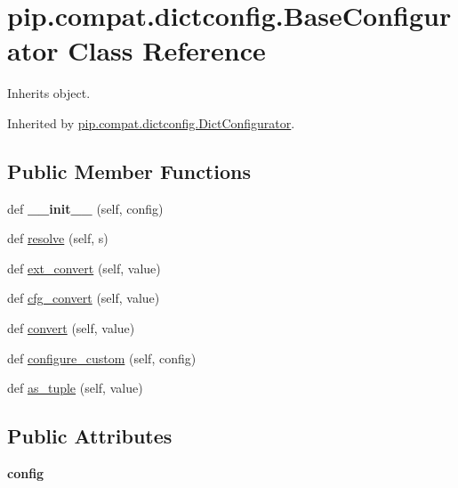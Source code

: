 \hypertarget{classpip_1_1compat_1_1dictconfig_1_1_base_configurator}{}\section{pip.\+compat.\+dictconfig.\+Base\+Configurator Class Reference}
\label{classpip_1_1compat_1_1dictconfig_1_1_base_configurator}


Inherits object.



Inherited by \hyperlink{classpip_1_1compat_1_1dictconfig_1_1_dict_configurator}{pip.\+compat.\+dictconfig.\+Dict\+Configurator}.

\subsection*{Public Member Functions}
\begin{DoxyCompactItemize}
\item 
\mbox{\label{classpip_1_1compat_1_1dictconfig_1_1_base_configurator_a9f6ff3792dd0d96509944cff23b9de46}} 
def {\bfseries \+\_\+\+\_\+init\+\_\+\+\_\+} (self, config)
\item 
def \hyperlink{classpip_1_1compat_1_1dictconfig_1_1_base_configurator_a725dbb93cfdbff08fc3ea9fbabe77860}{resolve} (self, s)
\item 
def \hyperlink{classpip_1_1compat_1_1dictconfig_1_1_base_configurator_aa6a371555c612cdb9149653dc9d7b47a}{ext\+\_\+convert} (self, value)
\item 
def \hyperlink{classpip_1_1compat_1_1dictconfig_1_1_base_configurator_a0bdc0a32a3393474db5e8f86f44f824f}{cfg\+\_\+convert} (self, value)
\item 
def \hyperlink{classpip_1_1compat_1_1dictconfig_1_1_base_configurator_a2caf473e25a04dbfcee4e57df8a8849f}{convert} (self, value)
\item 
def \hyperlink{classpip_1_1compat_1_1dictconfig_1_1_base_configurator_aca57746baed3a8d32cdcb9f36927f015}{configure\+\_\+custom} (self, config)
\item 
def \hyperlink{classpip_1_1compat_1_1dictconfig_1_1_base_configurator_a2125f5c394bb8bbae02b1ecf89b6ba10}{as\+\_\+tuple} (self, value)
\end{DoxyCompactItemize}
\subsection*{Public Attributes}
\begin{DoxyCompactItemize}
\item 
\mbox{\label{classpip_1_1compat_1_1dictconfig_1_1_base_configurator_ac1d83fa10bbdc42e2bfa1375945d17a1}} 
{\bfseries config}
\end{DoxyCompactItemize}
